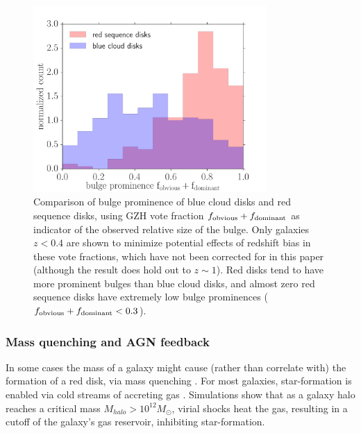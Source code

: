 \documentclass[useAMS,usenatbib]{mn2e}
\begin{document}
\begin{figure}
\centering
\includegraphics[width=3.5in]{figures/bulge_comparison.pdf}
\caption{Comparison of bulge prominence of blue cloud disks and red sequence disks, using GZH vote fraction $f_{\rm obvious} + f_{\rm dominant}$ as indicator of the observed relative size of the bulge. Only galaxies $z<0.4$ are shown to minimize potential effects of redshift bias in these vote fractions, which have not been corrected for in this paper (although the result does hold out to $z\sim1$). Red disks tend to have more prominent bulges than blue cloud disks, and almost zero red sequence disks have extremely low bulge prominences ($f_{\rm obvious} + f _{\rm dominant} < 0.3$).}
\label{fig:bulge}
\end{figure}
  
\subsubsection{Mass quenching and AGN feedback}
In some cases the mass of a galaxy might cause (rather than correlate with) the formation of a red disk, via mass quenching \citep{Kormendy2004,Peng2010,Schawinski2014,Smethurst2017}. For most galaxies, star-formation is enabled via cold streams of accreting gas \citet{Dekel2006}. Simulations \citep{Birnboim2003,Cattaneo2006} show that as a galaxy halo reaches a critical mass $M_{halo}>10^{12}M_{\odot}$, virial shocks heat the gas, resulting in a cutoff of the galaxy's gas reservoir, inhibiting star-formation. 
\end{document}
